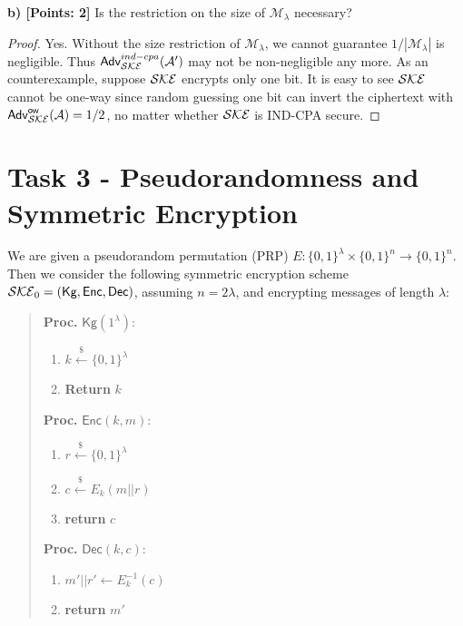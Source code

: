 \documentclass[12pt]{article}
\newcommand{\bits}{\{0,1\}}
\newcommand{\getsr}{\stackrel{\$}{\gets}}
\newcommand{\Adv}{\textsf{Adv}}
\newcommand{\M}{\mathcal{M}}
\theoremstyle{definition}
\newcommand{\Kg}{\textsf{Kg}}
\newcommand{\Enc}{\textsf{Enc}}
\newcommand{\Dec}{\textsf{Dec}}
\newcommand{\A}{\mathcal{A}}
\begin{document}
{\bf b) [Points: 2]} Is the restriction on the size of $\M_{\lambda}$ necessary?
\begin{proof}
Yes. Without the size restriction of $\M_{\lambda}$, we cannot guarantee $1/|\M_{\lambda}|$ is negligible. Thus $\Adv_{\SKE}^{ind-cpa}(\A')$ may not be non-negligible any more. As an counterexample, suppose $\mathcal{SKE}$ encrypts only one bit. It is easy to see $\mathcal{SKE}$ cannot be one-way since random guessing one bit can invert the ciphertext with $\Adv_{\SKE}^{\ow}(\A) = 1/2$, no matter whether $\mathcal{SKE}$ is IND-CPA secure.
\end{proof}

\section{Task 3 - Pseudorandomness and Symmetric Encryption}
We are given a pseudorandom permutation (PRP) $E : \bits^\lambda \times \bits^n \to \bits^n$. Then we consider the following symmetric encryption scheme $\SKE_0 = (\Kg,\Enc,\Dec)$, assuming $n=2\lambda$, and encrypting messages of length $\lambda$:
\begin{quote}
\begin{minipage}[t]{0.25\textwidth}
{\bf Proc.} $\Kg(1^\lambda)$:
\begin{enumerate}
\item $k \getsr \bits^\lambda$
\item {\bf Return} $k$
\end{enumerate}
\end{minipage}
\begin{minipage}[t]{0.3\textwidth}
{\bf Proc.} $\Enc(k, m)$:
\begin{enumerate}
\item $r \getsr \bits^\lambda$
\item $c \getsr E_k (m||r)$
\item {\bf return} $c$
\end{enumerate}
\end{minipage}
\begin{minipage}[t]{0.3\textwidth}
{\bf Proc.} $\Dec(k, c)$:
\begin{enumerate}
\item $m'||r' \gets E_k^{-1} (c)$
\item {\bf return} $m'$
\end{enumerate}
\end{minipage}
\end{quote}
\end{document}
